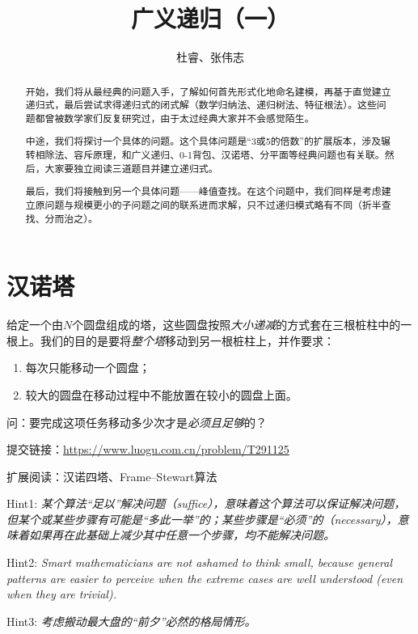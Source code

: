 \documentclass[12pt]{ctexart}
\title{广义递归（一）}
\author{杜睿、张伟志}
\begin{document}
\maketitle
\begin{abstract}
    开始，我们将从最经典的问题入手，了解如何首先形式化地命名建模，再基于直觉建立递归式，最后尝试求得递归式的闭式解（数学归纳法、递归树法、特征根法）。这些问题都曾被数学家们反复研究过，由于太过经典大家并不会感觉陌生。
    
    中途，我们将探讨一个具体的问题。这个具体问题是“3或5的倍数”的扩展版本，涉及辗转相除法、容斥原理，和广义递归、0-1背包、汉诺塔、分平面等经典问题也有关联。然后，大家要独立阅读三道题目并建立递归式。

    最后，我们将接触到另一个具体问题——峰值查找。在这个问题中，我们同样是考虑建立原问题与规模更小的子问题之间的联系进而求解，只不过递归模式略有不同（折半查找、分而治之）。
\end{abstract}

\section{汉诺塔}
给定一个由$N$个圆盘组成的塔，这些圆盘按照\emph{大小递减}的方式套在三根桩柱中的一根上。我们的目的是要将\emph{整个塔}移动到另一根桩柱上，并作要求：
\begin{enumerate}
    \item 每次只能移动一个圆盘；
    \item 较大的圆盘在移动过程中不能放置在较小的圆盘上面。
\end{enumerate}

问：要完成这项任务移动多少次才是\emph{必须且足够}的？\newline

提交链接：\url{https://www.luogu.com.cn/problem/T291125}

扩展阅读：汉诺四塔、Frame–Stewart算法

\newpage
Hint1: \textit{某个算法“足以”解决问题（suffice），意味着这个算法可以保证解决问题，但某个或某些步骤有可能是“多此一举”的；某些步骤是“必须”的（necessary），意味着如果再在此基础上减少其中任意一个步骤，均不能解决问题。}\newline

Hint2: \textit{Smart mathematicians 
are not ashamed to think small, 
because general patterns are easier to perceive when the extreme cases are well understood (even when they are trivial).
}\newline

Hint3: \textit{考虑搬动最大盘的“前夕”必然的格局情形。}
\end{document}
